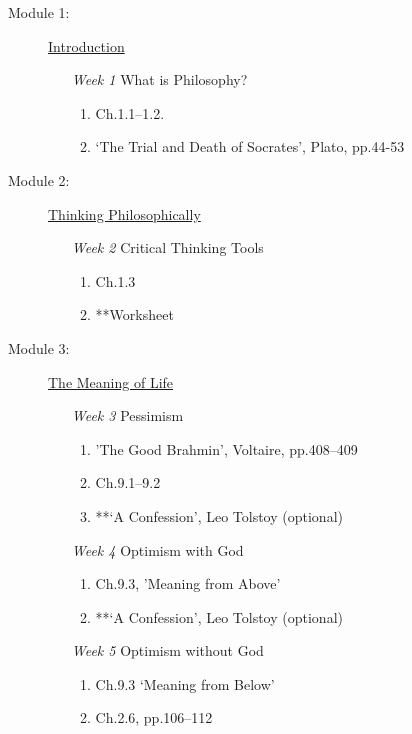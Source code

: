 \documentclass[article,oneside]{memoir}
\begin{document}
\begin{description}

\item[Module 1:] \href{http://scoconno.github.io/Teaching/Examined/Intro/}{Introduction}
\begin{enumerate}
\item[\textit{Week 1}] What is Philosophy?
\begin{enumerate}
\item Ch.1.1--1.2.
\item `The Trial and Death of Socrates', Plato, pp.44-53
\end{enumerate}
\end{enumerate}

\item[Module 2:] \href{http://scoconno.github.io/Teaching/Examined/CT/}{Thinking Philosophically}
\begin{enumerate}
\item[\textit{Week 2}] Critical Thinking Tools 
\begin{enumerate}
\item Ch.1.3
\item **Worksheet
\end{enumerate}
\end{enumerate}

\item[Module 3:] \href{http://scoconno.github.io/Teaching/Examined/Meaning/}{The Meaning of Life}

\begin{enumerate}
\item[\textit{Week 3}] Pessimism 
\begin{enumerate}
\item 'The Good Brahmin', Voltaire, pp.408--409
\item Ch.9.1--9.2 
\item **`A Confession', Leo Tolstoy (optional)
\end{enumerate}

\item[\textit{Week 4}] Optimism with God
\begin{enumerate}
\item Ch.9.3, 'Meaning from Above'
\item **`A Confession', Leo Tolstoy (optional)

\end{enumerate}

\item[\textit{Week 5}] Optimism without God
\begin{enumerate}
\item Ch.9.3 `Meaning from Below'
\item Ch.2.6, pp.106--112
\end{enumerate}
\end{enumerate}



\end{description}
\end{document}
